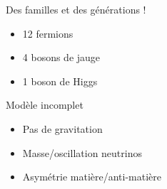 \documentclass[8pt]{beamer}
\begin{document}
\begin{frame}
\begin{minipage}{0.48\linewidth}
    \end{minipage}
    \begin{minipage}{0.48\linewidth}
      \begin{block}{Des familles et des générations !}
        \begin{itemize}
          \item 12 fermions
          \item 4 bosons de jauge
          \item 1 boson de Higgs
        \end{itemize}
      \end{block}
      \begin{block}{Modèle incomplet}
        \begin{itemize}
          \item Pas de gravitation
          \item Masse/oscillation neutrinos
          \item Asymétrie matière/anti-matière
        \end{itemize}
      \end{block}
    \end{minipage}
  \end{frame}
\end{document}
